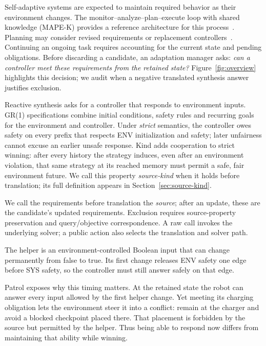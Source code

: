 Self-adaptive systems are expected to maintain required behavior as their
environment changes. The monitor--analyze--plan--execute loop with shared
knowledge (MAPE-K) provides a reference architecture for this
process~\cite{autonomic2003}. Planning may consider revised requirements or
replacement controllers~\cite{specrepair,degradation,dupdate}. Continuing an
ongoing task requires accounting for the current state and pending
obligations. Before discarding a candidate, an adaptation manager asks:
\emph{can a controller meet these requirements from the retained state?}
Figure~\ref{fig:overview} highlights this decision; we audit when a negative
translated synthesis answer justifies exclusion.

Reactive synthesis asks for a controller that responds to environment
inputs. GR(1) specifications combine initial conditions, safety rules and
recurring goals for the environment and controller. Under \emph{strict}
semantics, the controller owes safety on every prefix that respects ENV
initialization and safety; later unfairness cannot excuse an earlier unsafe
response. Kind adds cooperation to strict winning: after every history the
strategy induces, even after an environment violation, that same strategy
at its reached memory must permit a safe, fair environment future. We call
this property \emph{source-kind} when it holds before translation; its full
definition appears in Section~\ref{sec:source-kind}.

We call the requirements before translation the \emph{source}; after an
update, these are the candidate's updated requirements. Exclusion requires
source-property preservation and query/objective correspondence. A raw call
invokes the underlying solver; a public action also selects the translation
and solver path.


The helper is an environment-controlled Boolean input that can change
permanently from false to true. Its first change releases ENV safety one
edge before SYS safety, so the controller must still answer safely on that edge.

Patrol exposes why this timing matters. At the retained state the robot can
answer every input allowed by the first helper change. Yet meeting its
charging obligation lets the environment steer it into a conflict: remain
at the charger and avoid a blocked checkpoint placed there. That placement
is forbidden by the source but permitted by the helper. Thus being able to
respond now differs from maintaining that ability while winning.

